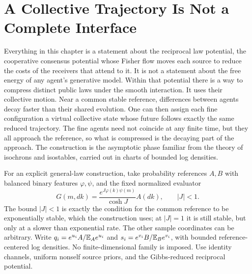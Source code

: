 \chapter{A Collective Trajectory Is Not a Complete Interface}
\label{comp:public-compression}

Everything in this chapter is a statement about the reciprocal law potential, the cooperative consensus potential whose Fisher flow moves each source to reduce the costs of the receivers that attend to it. It is not a statement about the free energy of any agent's generative model. Within that potential there is a way to compress distinct public laws under the smooth interaction. It uses their collective motion. Near a common stable reference, differences between agents decay faster than their shared evolution. One can then assign each fine configuration a virtual collective state whose future follows exactly the same reduced trajectory. The fine agents need not coincide at any finite time, but they all approach the reference, so what is compressed is the decaying part of the approach. The construction is the asymptotic phase familiar from the theory of isochrons and isostables, carried out in charts of bounded log densities.

For an explicit general-law construction, take probability references $A,B$ with balanced binary features $\varphi,\psi$, and the fixed normalized evaluator
\begin{equation}
 G(m,dk)=\frac{e^{J\varphi(k)\psi(m)}}{\cosh J}A(dk),\qquad |J|<1.
 \label{comp:eq-phase-evaluator}
\end{equation}
The bound $|J|<1$ is exactly the condition for the common reference to be exponentially stable, which the construction uses; at $|J|=1$ it is still stable, but only at a slower than exponential rate. The other sample coordinates can be arbitrary. Write $q_i=e^{u_i}A/\mathbb E_Ae^{u_i}$ and $s_i=e^{v_i}B/\mathbb E_Be^{v_i}$, with bounded reference-centered log densities. No finite-dimensional family is imposed. Use identity channels, uniform nonself source priors, and the Gibbs-reduced reciprocal potential.

